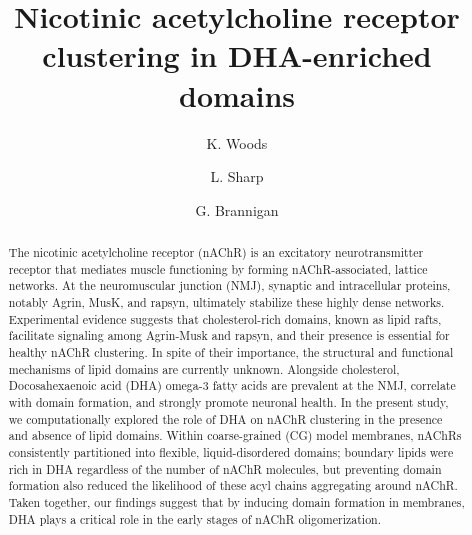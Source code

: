 \documentclass[final,3p,times,twocolumn]{elsarticle}
\begin{document}
\begin{frontmatter}


\title{Nicotinic acetylcholine receptor clustering in DHA-enriched domains}




\author[ccib]{K. Woods} 
\author[ccib,physics]{L. Sharp}
\author[ccib,physics]{G. Brannigan}
\address[ccib]{Center for Computational and Integrative Biology, Rutgers University-Camden, Camden, NJ}
\address[physics]{Department of Physics, Rutgers University-Camden, Camden, NJ}

\begin{abstract}

The nicotinic acetylcholine receptor (nAChR) is an excitatory neurotransmitter receptor that mediates muscle functioning by forming nAChR-associated, lattice networks. At the neuromuscular junction (NMJ), synaptic and intracellular proteins, notably Agrin, MusK, and rapsyn, ultimately stabilize these highly dense networks. Experimental evidence suggests that cholesterol-rich domains, known as lipid rafts, facilitate signaling among Agrin-Musk and rapsyn, and their presence is essential for healthy nAChR clustering. In spite of their importance, the structural and functional mechanisms of lipid domains are currently unknown. Alongside cholesterol, Docosahexaenoic acid (DHA) omega-3 fatty acids are prevalent at the NMJ, correlate with domain formation, and strongly promote neuronal health. In the present study, we computationally explored the role of DHA on nAChR clustering in the presence and absence of lipid domains. Within coarse-grained (CG) model membranes, nAChRs consistently partitioned into flexible, liquid-disordered domains; boundary lipids were rich in DHA regardless of the number of nAChR molecules, but preventing domain formation also reduced the likelihood of these acyl chains aggregating around nAChR. Taken together, our findings suggest that by inducing domain formation in membranes, DHA plays a critical role in the early stages of nAChR oligomerization.


\end{abstract}
\end{frontmatter}
\end{document}
